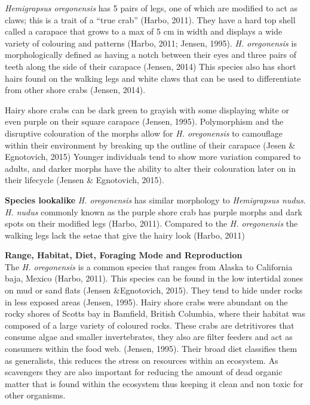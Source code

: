 \documentclass[
]{article}
\begin{document}
\emph{Hemigrapsus oregonensis} has 5 pairs of legs, one of which are
modified to act as claws; this is a trait of a ``true crab'' (Harbo,
2011). They have a hard top shell called a carapace that grows to a max
of 5 cm in width and displays a wide variety of colouring and patterns
(Harbo, 2011; Jensen, 1995). \emph{H. oregonensis} is morphologically
defined as having a notch between their eyes and three pairs of teeth
along the side of their carapace (Jensen, 2014) This species also has
short hairs found on the walking legs and white claws that can be used
to differentiate from other shore crabs (Jensen, 2014).

Hairy shore crabs can be dark green to grayish with some displaying
white or even purple on their square carapace (Jensen, 1995).
Polymorphism and the disruptive colouration of the morphs allow for
\emph{H. oregonensis} to camouflage within their environment by breaking
up the outline of their carapace (Jesen \& Egnotovich, 2015) Younger
individuals tend to show more variation compared to adults, and darker
morphs have the ability to alter their colouration later on in their
lifecycle (Jensen \& Egnotovich, 2015).

\textbf{Species lookalike} \emph{H. oregonensis} has similar morphology
to \emph{Hemigrapsus nudus}. \emph{H. nudus} commonly known as the
purple shore crab has purple morphs and dark spots on their modified
legs (Harbo, 2011). Compared to the \emph{H. oregonensis} the walking
legs lack the setae that give the hairy look (Harbo, 2011)

\textbf{Range, Habitat, Diet, Foraging Mode and Reproduction}\\
The \emph{H. oregonensis} is a common species that ranges from Alaska to
California baja, Mexico (Harbo, 2011). This species can be found in the
low intertidal zones on mud or sand flats (Jensen \&Egnotovich, 2015).
They tend to hide under rocks in less exposed areas (Jensen, 1995).
Hairy shore crabs were abundant on the rocky shores of Scotts bay in
Bamfield, British Columbia, where their habitat was composed of a large
variety of coloured rocks. These crabs are detritivores that consume
algae and smaller invertebrates, they also are filter feeders and act as
consumers within the food web. (Jensen, 1995). Their broad diet
classifies them as generalists, this reduces the stress on resources
within an ecosystem. As scavengers they are also important for reducing
the amount of dead organic matter that is found within the ecosystem
thus keeping it clean and non toxic for other organisms.
\end{document}
